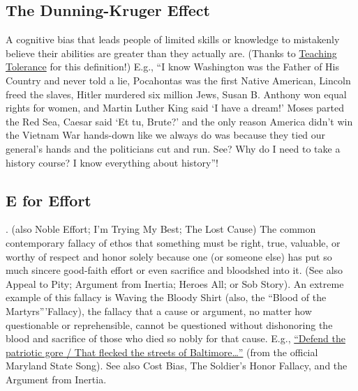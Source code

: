 \documentclass[10pt,a4paper,british]{article}
\begin{document}
\begin{multicols}{2}
	\subsection{The Dunning{-}Kruger Effect} A cognitive bias that leads people of limited skills or knowledge to mistakenly believe their abilities are greater than they actually are. (Thanks to \href{https://www.tolerance.org/magazine/fall-2017/speaking-of-digital-literacy}{Teaching Tolerance} for this definition!)  E.g., ``I know Washington was the Father of His Country and never told a lie, Pocahontas was the first Native American, Lincoln freed the slaves, Hitler murdered six million Jews, Susan B. Anthony won equal rights for women, and Martin Luther King said `I have a dream!'  Moses parted the Red Sea, Caesar said `Et tu, Brute?' and the only reason America didn't win the Vietnam War hands{-}down like we always do was because they tied our general's hands and the politicians cut and run. See?  Why do I need to take a history course? I know everything about history''!  

	\subsection{E for Effort}. (also Noble Effort; I'm Trying My Best; The Lost Cause) The common contemporary fallacy of ethos that something must be right, true, valuable, or worthy of respect and honor solely because one (or someone else) has put so much sincere good{-}faith effort or even sacrifice and bloodshed into it. (See also Appeal to Pity; Argument from Inertia; Heroes All; or Sob Story).  An extreme example of this fallacy is Waving the Bloody Shirt (also, the ``Blood of the Martyrs'''Fallacy), the fallacy that a cause or argument, no matter how questionable or reprehensible, cannot be questioned without dishonoring the blood and sacrifice of those who died so nobly for that cause. E.g., \href{https://en.wikipedia.org/wiki/Maryland,_My_Maryland#Lyrics}{``Defend the patriotic gore / That flecked the streets of Baltimore\ldots''} (from the official Maryland State Song). See also Cost Bias, The Soldier's Honor Fallacy, and the Argument from Inertia.  


\end{multicols}
\end{document}
